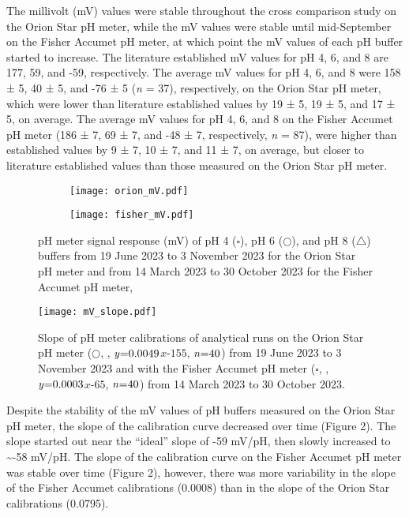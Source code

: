 \documentclass[
]{article}
\DeclareRobustCommand{\solidline}{\raisebox{2pt}{\tikz{\draw[thick](0,0) -- (0.5,0);}}}
\DeclareRobustCommand{\dashedline}{\raisebox{2pt}{\tikz{\draw[dashed, thick](0,0) -- (0.5,0);}}}
\begin{document}
The millivolt (mV) values were stable throughout the cross comparison
study on the Orion Star pH meter, while the mV values were stable until
mid-September on the Fisher Accumet pH meter, at which point the mV
values of each pH buffer started to increase. The literature established
mV values for pH 4, 6, and 8 are 177, 59, and -59, respectively. The
average mV values for pH 4, 6, and 8 were 158 ± 5, 40 ± 5, and -76 ± 5
(\emph{n} = 37), respectively, on the Orion Star pH meter, which were
lower than literature established values by 19 ± 5, 19 ± 5, and 17 ± 5,
on average. The average mV values for pH 4, 6, and 8 on the Fisher
Accumet pH meter (186 ± 7, 69 ± 7, and -48 ± 7, respectively, \emph{n} =
87), were higher than established values by 9 ± 7, 10 ± 7, and 11 ± 7,
on average, but closer to literature established values than those
measured on the Orion Star pH meter.

\begin{figure}[h]
  \begin{subfigure}{0.48\textwidth}
  \texttt{[image: orion\_mV.pdf]}
  \end{subfigure}%
  \begin{subfigure}{0.48\textwidth}
  \texttt{[image: fisher\_mV.pdf]}
  \end{subfigure}
\caption{pH meter signal response (mV) of pH 4 ($\square$), pH 6 ($\bigcirc$), and pH 8 ($\bigtriangleup$) buffers from 19 June 2023 to 3 November 2023 for the Orion Star pH meter and from 14 March 2023 to 30 October 2023 for the Fisher Accumet pH meter,}
\end{figure}

\begin{wrapfigure}[20]{r}{0.5\textwidth}
  \vspace{-0.5cm}
  \texttt{[image: mV\_slope.pdf]}
  \caption{Slope of pH meter calibrations of analytical runs on the Orion Star pH meter ($\bigcirc$, \protect\solidline, $\mbox{\textit{y}=0.0049}$$\textit{x}$$\mbox{-155}$, $\mbox{\textit{n}=40}$) from 19 June 2023 to 3 November 2023 and with the Fisher Accumet pH meter ($\square$, \protect\dashedline, $\mbox{\textit{y}=0.0003}$$\textit{x}$$\mbox{-65}$, $\mbox{\textit{n}=40}$) from 14 March 2023 to 30 October 2023.}
\end{wrapfigure}

Despite the stability of the mV values of pH buffers measured on the
Orion Star pH meter, the slope of the calibration curve decreased over
time (Figure 2). The slope started out near the ``ideal'' slope of -59
mV/pH, then slowly increased to \textasciitilde-58 mV/pH. The slope of
the calibration curve on the Fisher Accumet pH meter was stable over
time (Figure 2), however, there was more variability in the slope of the
Fisher Accumet calibrations (0.0008) than in the slope of the Orion Star
calibrations (0.0795). \pagebreak
\end{document}
